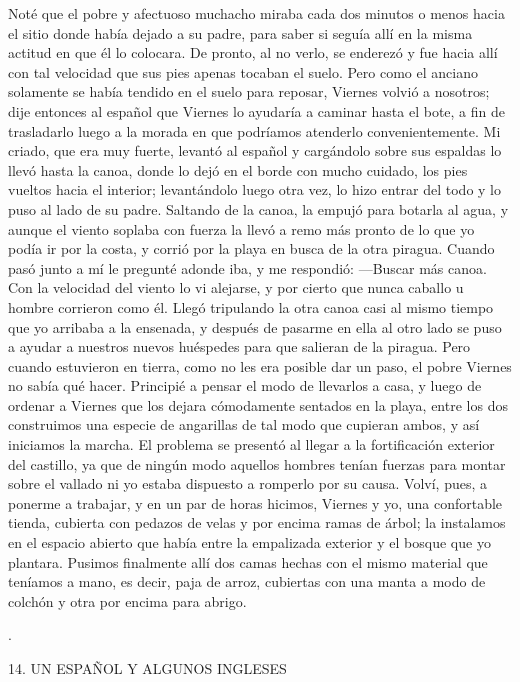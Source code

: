 \documentclass{novela}
\begin{document}
    Noté que el pobre y afectuoso muchacho miraba cada dos minutos o menos hacia el sitio donde había dejado a su padre, para saber si seguía allí en la misma actitud en que él lo colocara. De pronto, al no verlo, se enderezó y fue hacia allí con tal velocidad que sus pies apenas tocaban el suelo. Pero como el anciano solamente se había tendido en el suelo para reposar, Viernes volvió a nosotros; dije entonces al español que Viernes lo ayudaría a caminar hasta el bote, a fin de trasladarlo luego a la morada en que podríamos atenderlo convenientemente. Mi criado, que era muy fuerte, levantó al español y cargándolo sobre sus espaldas lo llevó hasta la canoa, donde lo dejó en el borde con mucho cuidado, los pies vueltos hacia el interior; levantándolo luego otra vez, lo hizo entrar del todo y lo puso al lado de su padre. Saltando de la canoa, la empujó para botarla al agua, y aunque el viento soplaba con fuerza la llevó a remo más pronto de lo que yo podía ir por la costa, y corrió por la playa en busca de la otra piragua. Cuando pasó junto a mí le pregunté adonde iba, y me respondió:
    —Buscar más canoa.
    Con la velocidad del viento lo vi alejarse, y por cierto que nunca caballo u hombre corrieron como él. Llegó tripulando la otra canoa casi al mismo tiempo que yo arribaba a la ensenada, y después de pasarme en ella al otro lado se puso a ayudar a nuestros nuevos huéspedes para que salieran de la piragua. Pero cuando estuvieron en tierra, como no les era posible dar un paso, el pobre Viernes no sabía qué hacer.
    Principié a pensar el modo de llevarlos a casa, y luego de ordenar a Viernes que los dejara cómodamente sentados en la playa, entre los dos construimos una especie de angarillas de tal modo que cupieran ambos, y así iniciamos la marcha. El problema se presentó al llegar a la fortificación exterior del castillo, ya que de ningún modo aquellos hombres tenían fuerzas para montar sobre el vallado ni yo estaba dispuesto a romperlo por su causa. Volví, pues, a ponerme a trabajar, y en un par de horas hicimos, Viernes y yo, una confortable tienda, cubierta con pedazos de velas y por encima ramas de árbol; la instalamos en el espacio abierto que había entre la empalizada exterior y el bosque que yo plantara. Pusimos finalmente allí dos camas hechas con el mismo material que teníamos a mano, es decir, paja de arroz, cubiertas con una manta a modo de colchón y otra por encima para abrigo.

    .


    14. UN ESPAÑOL Y ALGUNOS INGLESES
\end{document}
